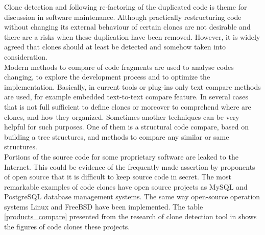 \documentclass{report}
\begin{document}
Clone detection and following re-factoring of the duplicated code is theme for discussion in software maintenance. Although practically restructuring code without changing its external behaviour of certain clones are not desirable and there are a risks when these duplication have been removed. However, it is widely agreed that clones should at least be detected and somehow taken into consideration.
\\
Modern methods to compare of code fragments are used to analyse codes changing, to explore the development process and to optimize the implementation. Basically, in current tools or plug-ins only text compare methods are used, for example embedded text-to-text compare feature. In several cases that is not full sufficient to define clones or moreover to comprehend where are clones, and how they organized. Sometimes another techniques can be very helpful for such purposes. One of them is a structural code compare, based on building a tree structures, and methods to compare any similar or same structures.
\\ 
Portions of the source code for some proprietary software are leaked to the Internet. This could be evidence of the frequently made assertion by proponents of open source that it is difficult to keep source code in secret. The most remarkable examples of code clones have open source projects as MySQL and PostgreSQL database management systems. The same way open-source operation systems Linux and FreeBSD have been implemented. The table \ref{products_compare} presented from the research of clone detection tool in \cite{CP-Miner} shows the figures of code clones these projects.
\end{document}
